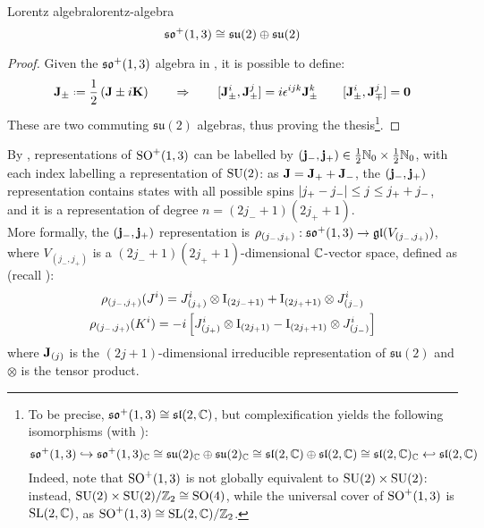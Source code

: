 \begin{proposition}[before upper = {\tcbtitle}]{Lorentz algebra}{lorentz-algebra}
  \begin{equation}
    \mathfrak{so}^+(1,3) \cong \mathfrak{su}(2) \oplus \mathfrak{su}(2)
  \end{equation}
\end{proposition}

\begin{proofbox}
  \begin{proof}
    Given the $ \mathfrak{so}^+(1,3) $ algebra in , it is possible to define:
    \begin{equation}
      \ve{J}_{\pm} \defeq \frac{1}{2} \left( \ve{J} \pm i \ve{K} \right)
      \qquad
      \Rightarrow
      \qquad
      [\ve{J}_{\pm}^i , \ve{J}_{\pm}^j] = i \epsilon^{ijk} \ve{J}_{\pm}^k
      \qquad
      [\ve{J}_{\pm}^i , \ve{J}_{\mp}^j] = \ve{0}
      \label{eq:lora-su2-gen}
    \end{equation}
    These are two commuting $ \mathfrak{su}(2) $ algebras, thus proving the thesis\footnote{To be precise, $ \mathfrak{so}^+(1,3) \cong \mathfrak{sl}(2,\mathbb{C}) $, but complexification yields the following isomorphisms (with ):
    \begin{equation*}
      \mathfrak{so}^+(1,3) \hookrightarrow \mathfrak{so}^+(1,3)_{\mathbb{C}} \cong \mathfrak{su}(2)_{\mathbb{C}} \oplus \mathfrak{su}(2)_{\mathbb{C}} \cong \mathfrak{sl}(2,\mathbb{C}) \oplus \mathfrak{sl}(2,\mathbb{C}) \cong \mathfrak{sl}(2,\mathbb{C})_{\mathbb{C}} \hookleftarrow \mathfrak{sl}(2,\mathbb{C})
    \end{equation*}
    Indeed, note that $ \mathrm{SO}^+(1,3) $ is not globally equivalent to $ \mathrm{SU}(2) \times \mathrm{SU}(2) $: instead, $ \mathrm{SU}(2) \times \mathrm{SU}(2) / \mathbb{Z}_2 \cong \mathrm{SO}(4) $, while the universal cover of $ \mathrm{SO}^+(1,3) $ is $ \mathrm{SL}(2,\mathbb{C}) $, as $ \mathrm{SO}^+(1,3) \cong \mathrm{SL}(2,\mathbb{C}) / \mathbb{Z}_2 $.}.
  \end{proof}
\end{proofbox}


By , representations of $ \mathrm{SO}^+(1,3) $ can be labelled by $ (\mathbf{j}_-,\mathbf{j}_+) \in \frac{1}{2} \mathbb{N}_0 \times \frac{1}{2} \mathbb{N}_0 $, with each index labelling a representation of $ \mathrm{SU}(2) $: as $ \mathbf{J} = \mathbf{J}_+ + \mathbf{J}_- $, the $ (\mathbf{j}_-,\mathbf{j}_+) $ representation contains states with all possible spins $ \left\lvert j_+ - j_-\right\rvert \le j \le j_+ + j_- $, and it is a representation of degree $ n = \left( 2j_- + 1 \right) \left( 2j_+ + 1 \right) $.\\
More formally, the $ (\mathbf{j}_-,\mathbf{j}_+) $ representation is $ \rho_{(j_-,j_+)} : \mathfrak{so}^+(1,3) \rightarrow \mathfrak{gl}(V_{(j_-,j_+)}) $, where $ V_{(j_-,j_+)} $ is a $ (2j_- + 1)(2j_+ + 1) $-dimensional $ \mathbb{C} $-vector space, defined as (recall ):
\begin{equation}
  \begin{gathered}
    \rho_{(j_-,j_+)}(J^i) = J^i_{(j_+)} \otimes \mathrm{I}_{(2j_- + 1)} + \mathrm{I}_{(2j_+ + 1)} \otimes J^i_{(j_-)} \\
    \rho_{(j_-,j_+)}(K^i) = -i \left[ J^i_{(j_+)} \otimes \mathrm{I}_{(2j_ + 1)} - \mathrm{I}_{(2j_+ + 1)} \otimes J^i_{(j_-)} \right]
  \end{gathered}
  \label{eq:lorentz-su2-repr}
\end{equation}
where $ \mathbf{J}_{(j)} $ is the $ (2j + 1) $-dimensional irreducible representation of $ \mathfrak{su}(2) $ and $ \otimes $ is the tensor product\footnotemark.

